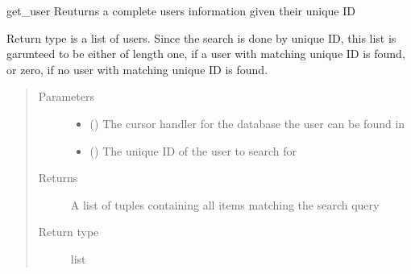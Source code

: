 \documentclass[letterpaper,10pt,english]{sphinxmanual}
\begin{document}
\begin{fulllineitems}
\label{\detokenize{flaskapp.data:flaskapp.data.database.get_user}}
get\_user Reuturns a complete users information given their unique ID

Return type is a list of users. Since the search is done by unique ID,
this list is garunteed to be either of length one, if a user with matching
unique ID is found, or zero, if no user with matching unique ID is found.
\begin{quote}\begin{description}
\item[{Parameters}] \leavevmode\begin{itemize}
\item {} 
 () \textendash{} The cursor handler for the database the user can be found in

\item {} 
 () \textendash{} The unique ID of the user to search for

\end{itemize}

\item[{Returns}] \leavevmode
A list of tuples containing all items matching the search query

\item[{Return type}] \leavevmode
list

\end{description}\end{quote}

\end{fulllineitems}

\end{document}
